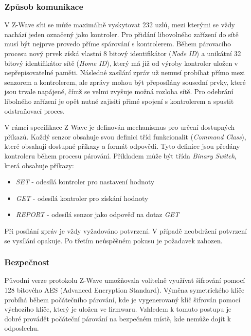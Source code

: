  \subsubsection{Způsob komunikace}
 V Z-Wave síti se může maximálně vyskytovat 232 uzlů, mezi kterými se vždy nachází jeden označený
 jako kontroler. Pro přidání libovolného zařízení do sítě musí být nejprve provedo příme spárování
 s kontrolerem. Během párovacího procesu nový prvek získá vlastní 8 bitový identifikátor (\textit{Node ID}) a 
 unikátní 32 bitový identifikátor sítě (\textit{Home ID}), který má již od výroby kontroler uložen v nepřepisovatelné paměti.
 Následné zasílání zpráv už nemusí probíhat přímo mezi senzorem a kontrolerem, ale zprávy mohou
 být přeposílány sousední prvky, které jsou trvale napájené, čímž se velmi zvyšuje možná rozloha sítě. 
 Pro odebrání libolného zařízení je opět nutné zajisiti přimé spojení s kontrolerem a spustit odstraňovací
 proces. \cite{cesnet-survey}
 
 V rámci specifikace Z-Wave \cite{zwave-spec} je definován mechanismus pro určení dostupných příkazů. Každý senzor obsahuje
 svou definici tříd funkcionalit (\textit{Command Class}), které obsahují dostupné příkazy a formát odpovědi. Tyto definice
 jsou předány kontroleru během procesu párování. Příkladem může být třída \textit{Binary Switch}, která obsahuje příkazy:
 \begin{itemize}
 \item \textit{SET} - odesílá kontroler pro nastavení hodnoty 
 \item \textit{GET} - odesílá kontroler pro získání hodnoty  
 \item \textit{REPORT} - odesílá senzor jako odpověď na dotaz \textit{GET} 
 \end{itemize} 
 
 Při posílání zpráv je vždy vyžadováno potvrzení. V případě neobdržení potvrzení se vysílání opakuje. 
 Po třetím neúspěšném pokusu je požadavek zahozen.
 
 \subsubsection{Bezpečnost}
 Původní verze protokolu Z-Wave umožňovala volitelně využívat šifrování pomocí 128 bitového AES (Advanced Encryption Standard).
 Výměna symetrického klíče probíhá během počátečního párování, kde je vygenerovaný klíč šifrován pomocí výchozího
 klíče, který je uložen ve firmwaru. Vzhledem k tomuto postupu je dobré provádět počáteční párování na bezpečném
 místě, kde nemůže dojít k odposlechu. \cite{zwave-S0-attack}
 
